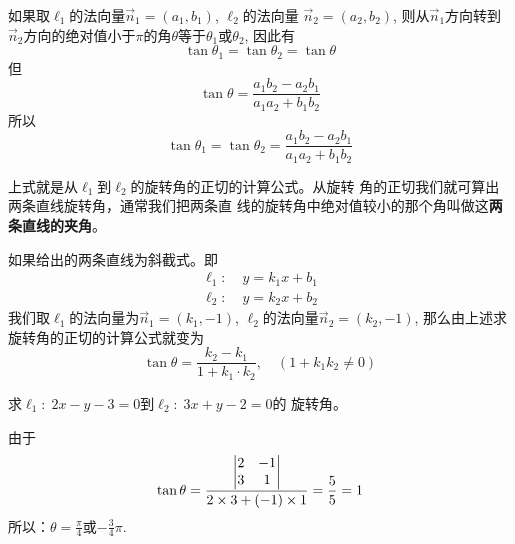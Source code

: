 \begin{figure}[htp]
    \centering
{}
    \caption{}
\end{figure}

如果取$\ell_1$的法向量$\vec{n}_1=(a_1,b_1)$, $\ell_2$的法向量
$\vec{n}_2=(a_2,b_2)$, 
则从$\vec{n}_1$方向转到$\vec{n}_2$方向的绝对值小于$\pi$的角$\theta$等于$\theta_1$或$\theta_2$, 
因此有
\[\tan\theta_1=\tan\theta_2=\tan\theta\]
但
\[\tan\theta=\frac{a_1b_2-a_2b_1}{a_1a_2+b_1b_2}\]
所以
\[\tan\theta_1=\tan\theta_2=\frac{a_1b_2-a_2b_1}{a_1a_2+b_1b_2}\]

上式就是从$\ell_1$到$\ell_2$的旋转角的正切的计算公式。从旋转
角的正切我们就可算出两条直线旋转角，通常我们把两条直
线的旋转角中绝对值较小的那个角叫做这\textbf{两条直线的夹角}。

如果给出的两条直线为斜截式。即
\[\begin{split}
    \ell_1:&\; y=k_1x+b_1\\
    \ell_2:&\; y=k_2x+b_2
  \end{split}\]
我们取$\ell_1$的法向量为$\vec{n}_1=(k_1,-1)$, $\ell_2$的法向量$\vec{n}_2=(k_2,-1)$, 
那么由上述求旋转角的正切的计算公式就变为
\[\tan\theta=\frac{k_2-k_1}{1+k_1\cdot k_2},\quad (1+k_1k_2\ne 0)\]

\begin{example}
    求$\ell_1:\; 2x-y-3=0$到$\ell_2:\; 3x+y-2=0$的
旋转角。
\end{example}

\begin{solution}
由于
\[\tan\theta=\dfrac{\begin{vmatrix}
    2&-1\\3&1
\end{vmatrix}}{2\times 3+(-1)\times 1}=\dfrac{5}{5}=1\]
所以：$\theta=\frac{\pi}{4}$或$-\frac{3}{4}\pi$.
\end{solution}

